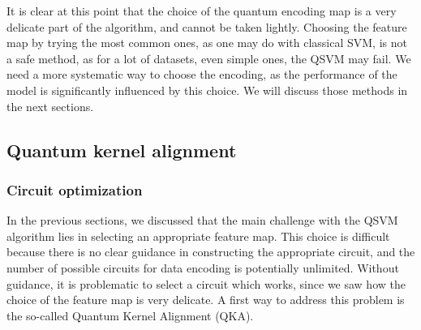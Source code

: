 \documentclass[12pt]{article}
\begin{document}
It is clear at this point that the choice of the quantum encoding map is a very delicate part of the algorithm, and cannot be taken lightly. Choosing the feature map by trying the most common ones, as one may do with classical SVM, is not a safe method, as for a lot of datasets, even simple ones, the QSVM may fail. We need a more systematic way to choose the encoding, as the performance of the model is significantly influenced by this choice. We will discuss those methods in the next sections.

\subsection{Quantum kernel alignment}
\subsubsection{Circuit optimization}

In the previous sections, we discussed that the main challenge with the QSVM algorithm lies in selecting an appropriate feature map. This choice is difficult because there is no clear guidance in constructing the appropriate circuit, and the number of possible circuits for data encoding is potentially unlimited. Without guidance, it is problematic to select a circuit which works, since we saw how the choice of the feature map is very delicate. A first way to address this problem is the so-called Quantum Kernel Alignment (QKA). 
\end{document}
